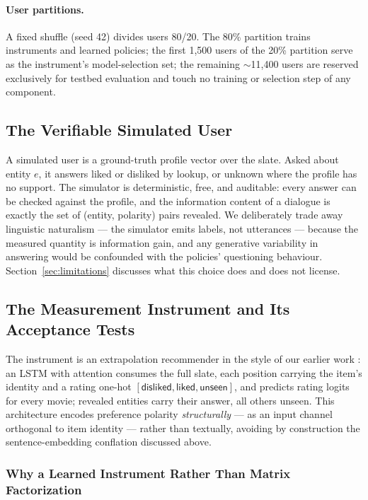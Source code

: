 \documentclass[11pt]{article}
\begin{document}
\paragraph{User partitions.} A fixed shuffle (seed 42) divides users 80/20.
The 80\% partition trains instruments and learned policies; the first
1{,}500 users of the 20\% partition serve as the instrument's
model-selection set; the remaining $\sim$11{,}400 users are reserved
exclusively for testbed evaluation and touch no training or selection step
of any component.

\subsection{The Verifiable Simulated User}

A simulated user is a ground-truth profile vector over the slate. Asked
about entity $e$, it answers \textsf{liked} or \textsf{disliked} by lookup,
or \textsf{unknown} where the profile has no support. The simulator is
deterministic, free, and auditable: every answer can be checked against the
profile, and the information content of a dialogue is exactly the set of
(entity, polarity) pairs revealed. We deliberately trade away linguistic
naturalism --- the simulator emits labels, not utterances --- because the
measured quantity is information gain, and any generative variability in
answering would be confounded with the policies' questioning behaviour.
Section~\ref{sec:limitations} discusses what this choice does and does not
license.

\subsection{The Measurement Instrument and Its Acceptance Tests}
\label{sec:instrument}

The instrument is an extrapolation recommender in the style of our earlier
work \citep{makarova2024learning}: an LSTM with attention consumes the full
slate, each position carrying the item's identity and a rating one-hot
$[\textsf{disliked}, \textsf{liked}, \textsf{unseen}]$, and predicts rating
logits for every movie; revealed entities carry their answer, all others
\textsf{unseen}. This architecture encodes preference polarity
\emph{structurally} --- as an input channel orthogonal to item identity ---
rather than textually, avoiding by construction the sentence-embedding
conflation discussed above.

\subsubsection{Why a Learned Instrument Rather Than Matrix Factorization}
\label{sec:why_not_mf}
\end{document}
